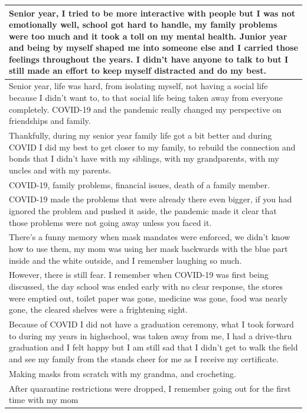 \documentclass[
  .7em,
  letterpaper,
  DIV=11,
  numbers=noendperiod]{scrartcl}
\begin{document}
\begin{table}
\begin{tabular}{l}
\hline
Senior year, I tried to be more interactive with people but I was not emotionally well, school got hard to handle, my family problems were too much and it took a toll on my mental health. Junior year and being by myself shaped me into someone else and I carried those feelings throughout the years. I didn't have anyone to talk to but I still made an effort to keep myself distracted and do my best.\\
\hline
Senior year, life was hard, from isolating myself, not having a social life because I didn't want to, to that social life being taken away from everyone completely. COVID-19 and the pandemic really changed my perspective on friendships and family.\\
\hline
Thankfully, during my senior year family life got a bit better and during COVID I did my best to get closer to my family, to rebuild the connection and bonds that I didn't have with my siblings, with my grandparents, with my uncles and with my parents.\\
\hline
COVID-19, family problems, financial issues, death of a family member.\\
\hline
COVID-19 made the problems that were already there even bigger, if you had ignored the problem and pushed it aside, the pandemic made it clear that those problems were not going away unless you faced it.\\
\hline
There's a funny memory when mask mandates were enforced, we didn't know how to use them, my mom was using her mask backwards with the blue part inside and the white outside, and I remember laughing so much.\\
\hline
However, there is still fear. I remember when COVID-19 was first being discussed, the day school was ended early with no clear response, the stores were emptied out, toilet paper was gone, medicine was gone, food was nearly gone, the cleared shelves were a frightening sight.\\
\hline
Because of COVID I did not have a graduation ceremony, what I took forward to during my years in highschool, was taken away from me, I had a drive-thru graduation and I felt happy but I am still sad that I didn't get to walk the field and see my family from the stands cheer for me as I receive my certificate.\\
\hline
Making masks from scratch with my grandma, and crocheting.\\
\hline
After quarantine restrictions were dropped, I remember going out for the first time with my mom\\

\end{tabular}
\end{table}
\end{document}
